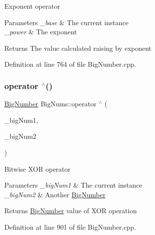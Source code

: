 Exponent operator 
\begin{DoxyParams}{Parameters}
{\em \+\_\+base} & The current instance \\
\hline
{\em \+\_\+power} & The exponent \\
\hline
\end{DoxyParams}
\begin{DoxyReturn}{Returns}
The value calculated raising by exponent 
\end{DoxyReturn}


Definition at line 764 of file Big\+Number.\+cpp.

\mbox{\label{namespace_big_nums_a991aa6b41e534b73bab66446db5909b7}} 
\subsubsection{\texorpdfstring{operator $^\wedge$()}{operator ^()}\hspace{0.1cm}{\footnotesize\ttfamily [2/2]}}
{\footnotesize\ttfamily \mbox{\hyperlink{class_big_nums_1_1_big_number}{Big\+Number}} Big\+Nums\+::operator $^\wedge$ (\begin{DoxyParamCaption}\item[{const \mbox{\hyperlink{class_big_nums_1_1_big_number}{Big\+Number}} \&}]{\+\_\+big\+Num1,  }\item[{const \mbox{\hyperlink{class_big_nums_1_1_big_number}{Big\+Number}} \&}]{\+\_\+big\+Num2 }\end{DoxyParamCaption})}

Bitwise X\+OR operator 
\begin{DoxyParams}{Parameters}
{\em \+\_\+big\+Num1} & The current instance \\
\hline
{\em \+\_\+big\+Num2} & Another \mbox{\hyperlink{class_big_nums_1_1_big_number}{Big\+Number}} \\
\hline
\end{DoxyParams}
\begin{DoxyReturn}{Returns}
\mbox{\hyperlink{class_big_nums_1_1_big_number}{Big\+Number}} value of X\+OR operation 
\end{DoxyReturn}


Definition at line 901 of file Big\+Number.\+cpp.

\mbox{\label{namespace_big_nums_a9bdd811316d31ba358ef97ee09cbb011}} 
